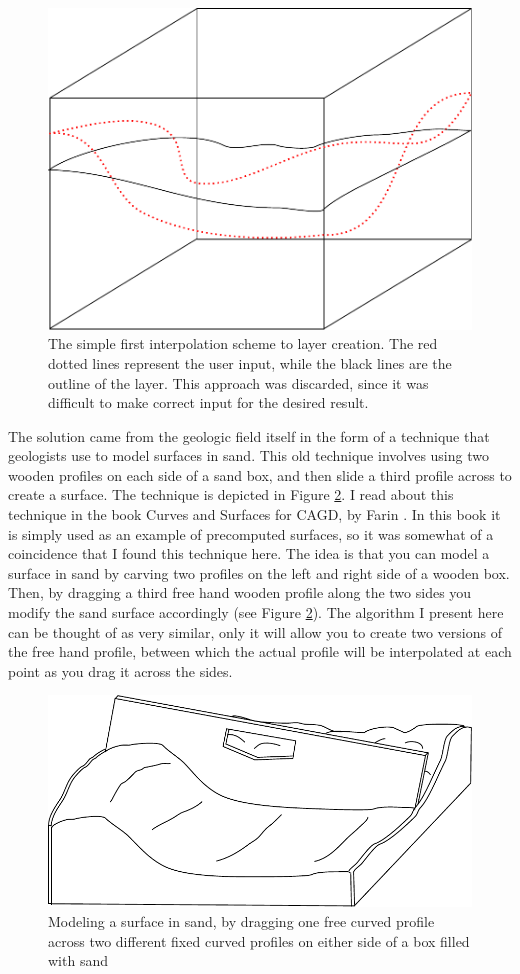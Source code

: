 \documentclass[a4paper,12pt]{report}
\begin{document}
\begin{figure}
 \centering
\includegraphics[width=.4\linewidth]{thesis/layerSimpleInterpol.pdf}
 \caption{The simple first interpolation scheme to layer creation. The red dotted lines represent the user input, while the black lines are the outline of the layer. This approach was discarded, since it was difficult to make correct input for the desired result.}
 \label{fig:layerSimpleInterpol}
\end{figure}

The solution came from the geologic field itself in the form of a technique that geologists use to model surfaces in sand. This old technique involves using two wooden profiles on each side of a sand box, and then slide a third profile across to create a surface. The technique is depicted in Figure \ref{fig:wooden}. I read about this technique in the book Curves and Surfaces for CAGD, by Farin \cite{farin2001curves}. In this book it is simply used as an example of precomputed surfaces, so it was somewhat of a coincidence that I found this technique here. The idea is that you can model a surface in sand by carving two profiles on the left and right side of a wooden box. Then, by dragging a third free hand wooden profile along the two sides you modify the sand surface accordingly (see Figure \ref{fig:wooden}). The algorithm I present here can be thought of as very similar, only it will allow you to create two versions of the free hand profile, between which the actual profile will be interpolated at each point 
as you drag it across the sides.

\begin{figure}
\centering
 \includegraphics[width=0.8\linewidth]{thesis/sandbox.pdf}
 \caption{Modeling a surface in sand, by dragging one free curved profile across two different fixed curved profiles on either side of a box filled with sand}
 \label{fig:wooden}
\end{figure}
\end{document}
